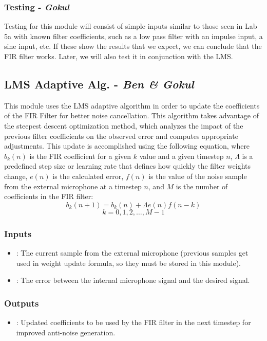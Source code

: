 \documentclass{fpgairpods}
\begin{document}
\begin{multicols*}{2}
\subsubsection{Testing - \textit{Gokul}}
Testing for this module will consist of simple inputs similar to those seen in Lab 5a with known filter coefficients, such as a low pass filter with an impulse input, a sine input, etc. If these show the results that we expect, we can conclude that the FIR filter works. Later, we will also test it in conjunction with the LMS.

\subsection{LMS Adaptive Alg. - \textit{Ben \& Gokul}}
This module uses the LMS adaptive algorithm in order to update the coefficients of the FIR Filter for better noise cancellation. This algorithm takes advantage of the steepest descent optimization method, which analyzes the impact of the previous filter coefficients on the observed error and computes appropriate adjustments. This update is accomplished using the following equation\cite{lmsfilter}, where $b_k(n)$ is the FIR coefficient for a given $k$ value and a given timestep $n$, $\Lambda$ is a predefined step size or learning rate that defines how quickly the filter weights change, $e(n)$ is the calculated error, $f(n)$ is the value of the noise sample from the external microphone at a timestep $n$, and $M$ is the number of coefficients in the FIR filter:
\[ b_k(n + 1) = b_k(n) + \Lambda e(n)f(n-k) \]
\[ k = 0, 1, 2,\ldots,  M-1 \]

\subsubsection{Inputs}
\begin{itemize}
    \item {}: The current sample from the external microphone (previous samples get used in weight update formula, so they must be stored in this module).
    \item {}: The error between the internal microphone signal and the desired signal.
\end{itemize}
\subsubsection{Outputs}
\begin{itemize}
    \item {}: Updated coefficients to be used by the FIR filter in the next timestep for improved anti-noise generation.
\end{itemize}

\end{multicols*}
\end{document}
